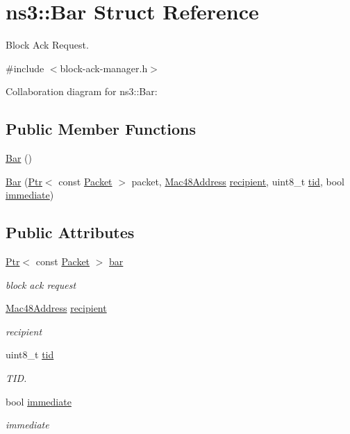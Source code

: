 \hypertarget{structns3_1_1Bar}{}\section{ns3\+:\+:Bar Struct Reference}
\label{structns3_1_1Bar}


Block Ack Request.  




{\ttfamily \#include $<$block-\/ack-\/manager.\+h$>$}



Collaboration diagram for ns3\+:\+:Bar\+:
\subsection*{Public Member Functions}
\begin{DoxyCompactItemize}
\item 
\hyperlink{structns3_1_1Bar_a1fea24298f984d140aea27401e238378}{Bar} ()
\item 
\hyperlink{structns3_1_1Bar_a69c8f09b604bd5e0c641f1e335302393}{Bar} (\hyperlink{classns3_1_1Ptr}{Ptr}$<$ const \hyperlink{classns3_1_1Packet}{Packet} $>$ packet, \hyperlink{classns3_1_1Mac48Address}{Mac48\+Address} \hyperlink{structns3_1_1Bar_a7fe6fa637f1d50a84036d780a5e5869a}{recipient}, uint8\+\_\+t \hyperlink{structns3_1_1Bar_a85c4339ebc82a36ac4e8240d1fd8f9c8}{tid}, bool \hyperlink{structns3_1_1Bar_a8f52d4a427d872c0fd1fb51562bd6433}{immediate})
\end{DoxyCompactItemize}
\subsection*{Public Attributes}
\begin{DoxyCompactItemize}
\item 
\hyperlink{classns3_1_1Ptr}{Ptr}$<$ const \hyperlink{classns3_1_1Packet}{Packet} $>$ \hyperlink{structns3_1_1Bar_a9146d86c9793c9b993d4eeb5587f8d53}{bar}
\begin{DoxyCompactList}\small\item\em block ack request \end{DoxyCompactList}\item 
\hyperlink{classns3_1_1Mac48Address}{Mac48\+Address} \hyperlink{structns3_1_1Bar_a7fe6fa637f1d50a84036d780a5e5869a}{recipient}
\begin{DoxyCompactList}\small\item\em recipient \end{DoxyCompactList}\item 
uint8\+\_\+t \hyperlink{structns3_1_1Bar_a85c4339ebc82a36ac4e8240d1fd8f9c8}{tid}
\begin{DoxyCompactList}\small\item\em T\+ID. \end{DoxyCompactList}\item 
bool \hyperlink{structns3_1_1Bar_a8f52d4a427d872c0fd1fb51562bd6433}{immediate}
\begin{DoxyCompactList}\small\item\em immediate \end{DoxyCompactList}\end{DoxyCompactItemize}


